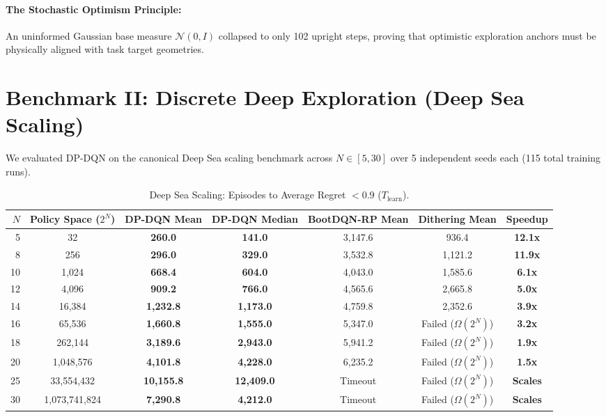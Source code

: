 \documentclass{article}
\begin{document}
\paragraph{The Stochastic Optimism Principle:} An uninformed Gaussian base measure $\mathcal{N}(0, I)$ collapsed to only 102 upright steps, proving that optimistic exploration anchors must be physically aligned with task target geometries.

\section{Benchmark II: Discrete Deep Exploration (Deep Sea Scaling)}
We evaluated DP-DQN on the canonical Deep Sea scaling benchmark across $N \in [5, 30]$ over 5 independent seeds each (115 total training runs).

\begin{table}[h]
\centering
\small
\caption{Deep Sea Scaling: Episodes to Average Regret $< 0.9$ ($T_{\text{learn}}$).}
\begin{tabular}{rcccccc}
\toprule
$N$ & Policy Space ($2^N$) & \textbf{DP-DQN Mean} & \textbf{DP-DQN Median} & \textbf{BootDQN-RP Mean} & \textbf{Dithering Mean} & \textbf{Speedup} \\
\midrule
5  & 32          & \textbf{260.0}  & \textbf{141.0}  & 3,147.6 & 936.4  & \textbf{12.1x} \\
8  & 256         & \textbf{296.0}  & \textbf{329.0}  & 3,532.8 & 1,121.2 & \textbf{11.9x} \\
10 & 1,024       & \textbf{668.4}  & \textbf{604.0}  & 4,043.0 & 1,585.6 & \textbf{6.1x} \\
12 & 4,096       & \textbf{909.2}  & \textbf{766.0}  & 4,565.6 & 2,665.8 & \textbf{5.0x} \\
14 & 16,384      & \textbf{1,232.8} & \textbf{1,173.0} & 4,759.8 & 2,352.6 & \textbf{3.9x} \\
16 & 65,536      & \textbf{1,660.8} & \textbf{1,555.0} & 5,347.0 & Failed ($\Omega(2^N)$) & \textbf{3.2x} \\
18 & 262,144     & \textbf{3,189.6} & \textbf{2,943.0} & 5,941.2 & Failed ($\Omega(2^N)$) & \textbf{1.9x} \\
20 & 1,048,576   & \textbf{4,101.8} & \textbf{4,228.0} & 6,235.2 & Failed ($\Omega(2^N)$) & \textbf{1.5x} \\
25 & 33,554,432  & \textbf{10,155.8} & \textbf{12,409.0} & Timeout & Failed ($\Omega(2^N)$) & \textbf{Scales} \\
30 & 1,073,741,824 & \textbf{7,290.8} & \textbf{4,212.0} & Timeout & Failed ($\Omega(2^N)$) & \textbf{Scales} \\
\bottomrule
\end{tabular}
\end{table}
\end{document}
